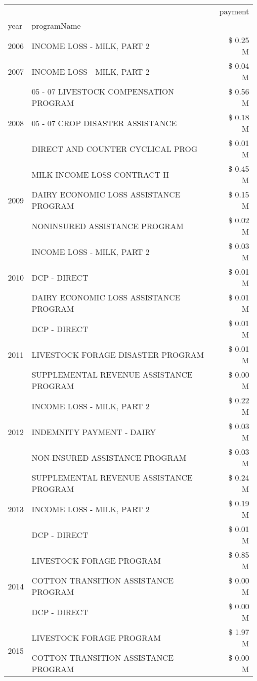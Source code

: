 \begin{tabular}{llr}
\toprule
 &  & payment \\
year & programName &  \\
\midrule
2006 & INCOME LOSS - MILK, PART 2 & \$ 0.25 M \\
\cline{1-3}
2007 & INCOME LOSS - MILK, PART 2 & \$ 0.04 M \\
\cline{1-3}
\multirow[t]{3}{*}{2008} & 05 - 07 LIVESTOCK COMPENSATION PROGRAM & \$ 0.56 M \\
 & 05 - 07 CROP DISASTER ASSISTANCE & \$ 0.18 M \\
 & DIRECT AND COUNTER CYCLICAL PROG & \$ 0.01 M \\
\cline{1-3}
\multirow[t]{3}{*}{2009} & MILK INCOME LOSS CONTRACT II & \$ 0.45 M \\
 & DAIRY ECONOMIC LOSS ASSISTANCE PROGRAM & \$ 0.15 M \\
 & NONINSURED ASSISTANCE PROGRAM & \$ 0.02 M \\
\cline{1-3}
\multirow[t]{3}{*}{2010} & INCOME LOSS - MILK, PART 2 & \$ 0.03 M \\
 & DCP - DIRECT & \$ 0.01 M \\
 & DAIRY ECONOMIC LOSS ASSISTANCE PROGRAM & \$ 0.01 M \\
\cline{1-3}
\multirow[t]{3}{*}{2011} & DCP - DIRECT & \$ 0.01 M \\
 & LIVESTOCK FORAGE DISASTER PROGRAM & \$ 0.01 M \\
 & SUPPLEMENTAL REVENUE ASSISTANCE PROGRAM & \$ 0.00 M \\
\cline{1-3}
\multirow[t]{3}{*}{2012} & INCOME LOSS - MILK, PART 2 & \$ 0.22 M \\
 & INDEMNITY PAYMENT - DAIRY & \$ 0.03 M \\
 & NON-INSURED ASSISTANCE PROGRAM & \$ 0.03 M \\
\cline{1-3}
\multirow[t]{3}{*}{2013} & SUPPLEMENTAL REVENUE ASSISTANCE PROGRAM & \$ 0.24 M \\
 & INCOME LOSS - MILK, PART 2 & \$ 0.19 M \\
 & DCP - DIRECT & \$ 0.01 M \\
\cline{1-3}
\multirow[t]{3}{*}{2014} & LIVESTOCK FORAGE PROGRAM & \$ 0.85 M \\
 & COTTON TRANSITION ASSISTANCE PROGRAM & \$ 0.00 M \\
 & DCP - DIRECT & \$ 0.00 M \\
\cline{1-3}
\multirow[t]{2}{*}{2015} & LIVESTOCK FORAGE PROGRAM & \$ 1.97 M \\
 & COTTON TRANSITION ASSISTANCE PROGRAM & \$ 0.00 M \\

\end{tabular}
